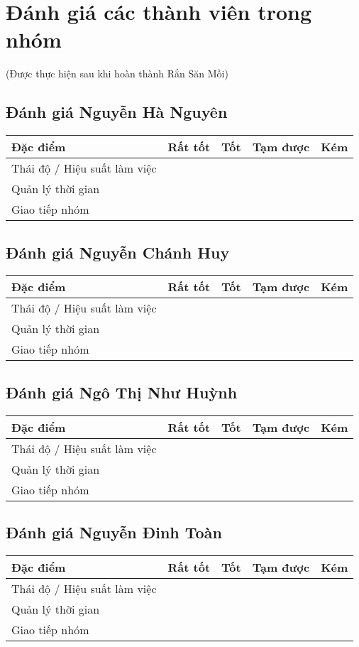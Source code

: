 \documentclass[a4paper,12pt]{article}
\begin{document}
\newpage
\section{Đánh giá các thành viên trong nhóm} (Được thực hiện sau khi hoàn thành Rắn Săn Mồi)

\subsection{Đánh giá Nguyễn Hà Nguyên}
\begin{tabularx}{\textwidth}{|X|X|X|X|X|}
\hline
\textbf{Đặc điểm} & \textbf{Rất tốt} & \textbf{Tốt} & \textbf{Tạm được} & \textbf{Kém} \\
\hline
Thái độ / Hiệu suất làm việc &  & & & \\
\hline
Quản lý thời gian & &  & & \\
\hline
Giao tiếp nhóm &  & & & \\
\hline
\end{tabularx}

\subsection{Đánh giá Nguyễn Chánh Huy}
\begin{tabularx}{\textwidth}{|X|X|X|X|X|}
\hline
\textbf{Đặc điểm} & \textbf{Rất tốt} & \textbf{Tốt} & \textbf{Tạm được} & \textbf{Kém} \\
\hline
Thái độ / Hiệu suất làm việc & &  & & \\
\hline
Quản lý thời gian &  & & & \\
\hline
Giao tiếp nhóm & &  & & \\
\hline
\end{tabularx}

\subsection{Đánh giá Ngô Thị Như Huỳnh}
\begin{tabularx}{\textwidth}{|X|X|X|X|X|}
\hline
\textbf{Đặc điểm} & \textbf{Rất tốt} & \textbf{Tốt} & \textbf{Tạm được} & \textbf{Kém} \\
\hline
Thái độ / Hiệu suất làm việc &  & & & \\
\hline
Quản lý thời gian & &  & & \\
\hline
Giao tiếp nhóm & &  & & \\
\hline
\end{tabularx}

\subsection{Đánh giá Nguyễn Đinh Toàn}
\begin{tabularx}{\textwidth}{|X|X|X|X|X|}
\hline
\textbf{Đặc điểm} & \textbf{Rất tốt} & \textbf{Tốt} & \textbf{Tạm được} & \textbf{Kém} \\
\hline
Thái độ / Hiệu suất làm việc &  & & & \\
\hline
Quản lý thời gian & &  & & \\
\hline
Giao tiếp nhóm &  & & & \\
\hline
\end{tabularx}
\end{document}
